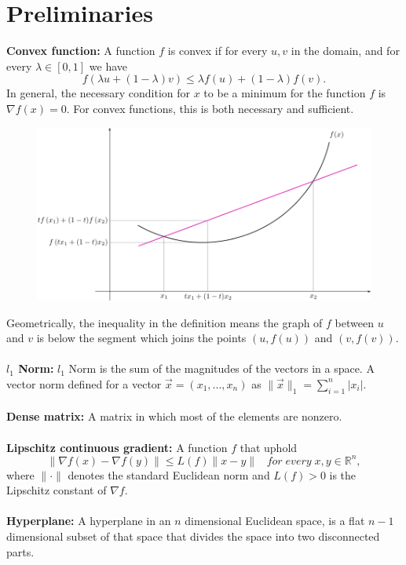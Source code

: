 \documentclass[12pt]{article}
\begin{document}
\section{Preliminaries}
\textbf{Convex	function:} A function $f$ is	convex	if	for	every $u,v$ in	the	domain,	and	for	every $\lambda \in [0,1]$ we have 
$$ f(\lambda u +(1-\lambda)v) \leq \lambda f(u) + (1-\lambda)f(v).$$
In	general, the necessary condition for $x$ to be a minimum for the function $f$ is $\nabla f(x)=0$. 
For	convex functions, this is both necessary and sufficient.\\
\begin{figure}[H]
\centering
\includegraphics[scale=0.5]{convex.png}
\end{figure}
Geometrically, the inequality in the definition means the graph of $f$ between $u$ and $v$ is below the segment which joins the points $(u,f(u))$ and $(v,f(v))$.\\
\\\textbf{$l_1$ Norm:} $l_1$ Norm is the sum of the magnitudes of the vectors in a space. A vector norm defined for a vector $\Vec{x}=(x_1,...,x_n)$ as $\|\Vec{x}\|_1 = \sum_{i=1}^{n} |x_i|$.\\
\\\textbf{Dense matrix:} A matrix in which most of the elements are nonzero.\\
\\\textbf{Lipschitz continuous gradient:} A  function $f$ that uphold 
$$\| \nabla f(x) - \nabla f(y) \| \leq L(f) \|x-y\| \;\;\;for \;every\; x,y \in \mathbb{R}^n ,$$
where $\| \cdot \|$ denotes the standard Euclidean norm and $L(f) > 0$ is the Lipschitz constant of $\nabla f$.\\
\\\textbf{Hyperplane:} A hyperplane in an $n$ dimensional Euclidean space, is a flat  $n-1$ dimensional subset of that space that divides the space into two disconnected parts.\\
\end{document}
